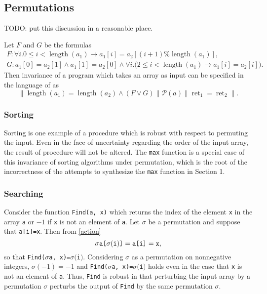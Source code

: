 \documentclass{llncs}
\DeclareMathOperator{\Perm}{Perm}
\DeclareMathOperator{\len}{length}
\DeclareMathOperator{\ret}{ret}
\begin{document}
  \subsection{Permutations}


    TODO: put this discussion in a reasonable place.

    Let \(F\) and \(G\) be the formulas
    \begin{gather*}
        F:  \forall i. 0 \leq i < \len(a_{1}) \rightarrow a_{1}[i] = a_{2}[(i+1)\%\len(a_{1})],\\
            G: a_{1}[0] = a_{2}[1] \wedge a_{1}[1] = a_{2}[0] \wedge 
              \forall i.\big( 2 \leq i < \len(a_{1}) \rightarrow a_{1}[i] = a_{2}[i] \big).
    \end{gather*}
    Then invariance of a program which takes an array as input can be specified
    in the language of \cite{sousa16} as
    \[
      \|\len(a_{1}) = \len(a_{2}) \wedge (F \vee G)\| 
        \mathcal{P}(a) \|\ret_{1} = \ret_{2}\|.
    \]

  \subsubsection{Sorting}

    Sorting is one example of a procedure which is robust with respect to permuting
    the input.  Even in the face of uncertainty regarding the order of the input
    array, the result of procedure will not be altered.  The \verb!max! function is
    a special case of this invariance of sorting algorithms under permutation, which
    is the root of the incorrectness of the attempts to synthesize the \verb!max!
    function in Section 1.

  \subsubsection{Searching}

    Consider the function \verb!Find(a, x)! which returns the index of the element
    \verb!x! in the array \verb!a! or \(-1\) if \verb!x! is not an element of
    \verb!a!.  Let \(\sigma\) be a permutation and suppose that \verb!a[i]=x!.  Then
    from \eqref{action} \[\sigma\verb!a[!\sigma(\verb!i!)\verb!]! = \verb!a[i]! =
    \verb!x!,\] so that \verb!Find(!\(\sigma\)\verb!a, x)=!\(\sigma(\)\verb!i!\()\).
    Considering \(\sigma\) as a permutation on nonnegative integers, \(\sigma(-1) =
    -1\) and \verb!Find(!\(\sigma\)\verb!a, x)=!\(\sigma(\)\verb!i!\()\) holds even
    in the case that \verb!x! is not an element of \verb!a!.  Thus, \verb!Find! is
    robust in that perturbing the input array by a permutation \(\sigma\) perturbs
    the output of \verb!Find! by the same permutation \(\sigma\).
\end{document}
